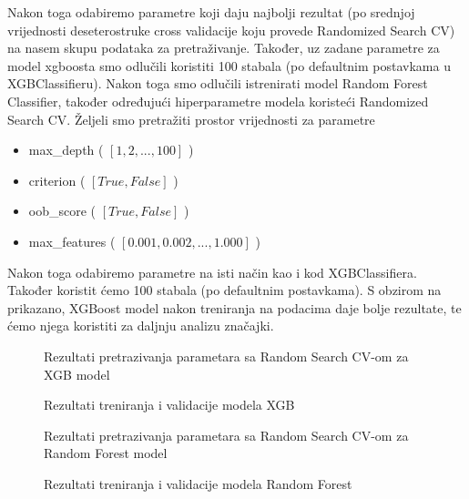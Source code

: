 \documentclass[conference]{IEEEtran}
\newlength\figureheight
\newlength\figurewidth
\begin{document}
Nakon toga odabiremo parametre koji daju najbolji rezultat (po srednjoj vrijednosti deseterostruke cross validacije koju provede Randomized Search CV) na nasem skupu podataka za pretraživanje. Također, uz zadane parametre za model xgboosta smo odlučili koristiti 100 stabala (po defaultnim postavkama u XGBClassifieru).
Nakon toga smo odlučili istrenirati model Random Forest Classifier, također određujući hiperparametre modela koristeći Randomized Search CV. Željeli smo pretražiti prostor vrijednosti za parametre 
\begin{itemize} 
\item max\_depth ( $[1, 2,..., 100]$ )
\item criterion ( $[True, False]$ )
\item oob\_score ( $[True, False]$ )
\item max\_features ( $[0.001, 0.002,..., 1.000] $ )
\end{itemize}
Nakon toga odabiremo parametre na isti način kao i kod XGBClassifiera. Također koristit ćemo 100 stabala (po defaultnim postavkama).
S obzirom na prikazano, XGBoost model nakon treniranja na podacima daje bolje rezultate, te ćemo njega koristiti za daljnju analizu značajki.
\setlength\figureheight{2.5in}
\setlength\figurewidth{3.5in}
\begin{figure}[h]
\caption{Rezultati pretrazivanja parametara sa Random Search CV-om za XGB model}
\end{figure}
\begin{figure}[h]
\caption{Rezultati treniranja i validacije modela XGB}
\end{figure}
\begin{figure}[h]
\caption{Rezultati pretrazivanja parametara sa Random Search CV-om za Random Forest model}
\end{figure}
\begin{figure}[h]
\caption{Rezultati treniranja i validacije modela Random Forest}
\end{figure}
\end{document}
